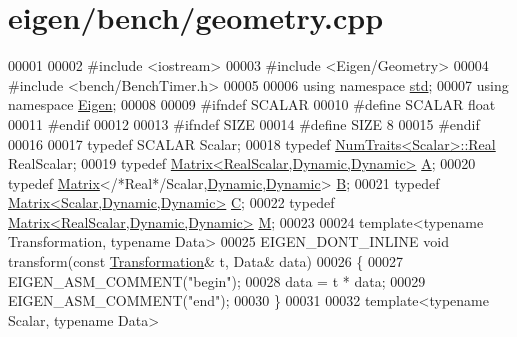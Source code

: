 \hypertarget{eigen_2bench_2geometry_8cpp_source}{}\section{eigen/bench/geometry.cpp}
\label{eigen_2bench_2geometry_8cpp_source}

\begin{DoxyCode}
00001 
00002 \textcolor{preprocessor}{#include <iostream>}
00003 \textcolor{preprocessor}{#include <Eigen/Geometry>}
00004 \textcolor{preprocessor}{#include <bench/BenchTimer.h>}
00005 
00006 \textcolor{keyword}{using namespace }\hyperlink{namespacestd}{std};
00007 \textcolor{keyword}{using namespace }\hyperlink{namespace_eigen}{Eigen};
00008 
00009 \textcolor{preprocessor}{#ifndef SCALAR}
00010 \textcolor{preprocessor}{#define SCALAR float}
00011 \textcolor{preprocessor}{#endif}
00012 
00013 \textcolor{preprocessor}{#ifndef SIZE}
00014 \textcolor{preprocessor}{#define SIZE 8}
00015 \textcolor{preprocessor}{#endif}
00016 
00017 \textcolor{keyword}{typedef} SCALAR Scalar;
00018 \textcolor{keyword}{typedef} \hyperlink{group___core___module_struct_eigen_1_1_num_traits}{NumTraits<Scalar>::Real} RealScalar;
00019 \textcolor{keyword}{typedef} \hyperlink{group___core___module_class_eigen_1_1_matrix}{Matrix<RealScalar,Dynamic,Dynamic>} \hyperlink{group___core___module_class_eigen_1_1_matrix}{A};
00020 \textcolor{keyword}{typedef} \hyperlink{group___core___module_class_eigen_1_1_matrix}{Matrix}<\textcolor{comment}{/*Real*/}Scalar,\hyperlink{namespace_eigen_ad81fa7195215a0ce30017dfac309f0b2}{Dynamic},\hyperlink{namespace_eigen_ad81fa7195215a0ce30017dfac309f0b2}{Dynamic}> \hyperlink{group___core___module_class_eigen_1_1_matrix}{B};
00021 \textcolor{keyword}{typedef} \hyperlink{group___core___module}{Matrix<Scalar,Dynamic,Dynamic>} \hyperlink{group___core___module}{C};
00022 \textcolor{keyword}{typedef} \hyperlink{group___core___module_class_eigen_1_1_matrix}{Matrix<RealScalar,Dynamic,Dynamic>} \hyperlink{group___core___module_class_eigen_1_1_matrix}{M};
00023 
00024 \textcolor{keyword}{template}<\textcolor{keyword}{typename} Transformation, \textcolor{keyword}{typename} Data>
00025 EIGEN\_DONT\_INLINE \textcolor{keywordtype}{void} transform(\textcolor{keyword}{const} \hyperlink{class_transformation}{Transformation}& t, Data& data)
00026 \{
00027   EIGEN\_ASM\_COMMENT(\textcolor{stringliteral}{"begin"});
00028   data = t * data;
00029   EIGEN\_ASM\_COMMENT(\textcolor{stringliteral}{"end"});
00030 \}
00031 
00032 \textcolor{keyword}{template}<\textcolor{keyword}{typename} Scalar, \textcolor{keyword}{typename} Data>

\end{DoxyCode}
